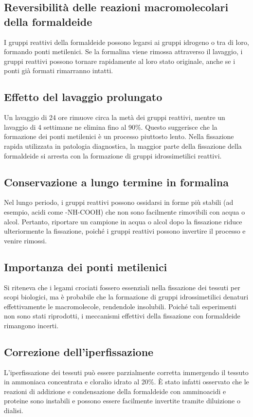 \subsection{Reversibilità delle reazioni macromolecolari della formaldeide}
I gruppi reattivi della formaldeide possono legarsi ai gruppi idrogeno o tra di loro, formando ponti metilenici. Se la formalina viene rimossa attraverso il lavaggio, i gruppi reattivi possono tornare rapidamente al loro stato originale, anche se i ponti già formati rimarranno intatti.

\subsection{Effetto del lavaggio prolungato}
Un lavaggio di 24 ore rimuove circa la metà dei gruppi reattivi, mentre un lavaggio di 4 settimane ne elimina fino al 90\%. Questo suggerisce che la formazione dei ponti metilenici è un processo piuttosto lento. Nella fissazione rapida utilizzata in patologia diagnostica, la maggior parte della fissazione della formaldeide si arresta con la formazione di gruppi idrossimetilici reattivi.

\subsection{Conservazione a lungo termine in formalina}
Nel lungo periodo, i gruppi reattivi possono ossidarsi in forme più stabili (ad esempio, acidi come -NH-COOH) che non sono facilmente rimovibili con acqua o alcol. Pertanto, riportare un campione in acqua o alcol dopo la fissazione riduce ulteriormente la fissazione, poiché i gruppi reattivi possono invertire il processo e venire rimossi.

\subsection{Importanza dei ponti metilenici}
Si riteneva che i legami crociati fossero essenziali nella fissazione dei tessuti per scopi biologici, ma è probabile che la formazione di gruppi idrossimetilici denaturi effettivamente le macromolecole, rendendole insolubili. Poiché tali esperimenti non sono stati riprodotti, i meccanismi effettivi della fissazione con formaldeide rimangono incerti.

\subsection{Correzione dell'iperfissazione}
L'iperfissazione dei tessuti può essere parzialmente corretta immergendo il tessuto in ammoniaca concentrata e cloralio idrato al 20\%. È stato infatti osservato che le reazioni di addizione e condensazione della formaldeide con amminoacidi e proteine sono instabili e possono essere facilmente invertite tramite diluizione o dialisi.

